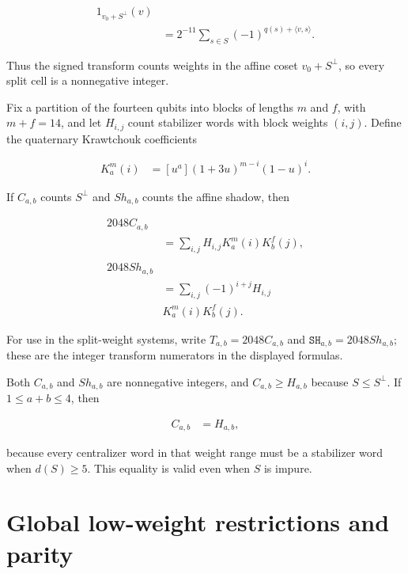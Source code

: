 \documentclass[11pt]{article}
\begin{document}
\[
\begin{aligned}
1_{v_{0}+S^\perp}(v) \\
& = 2^{-11} \sum_{s \in S} (-1)^{q(s)+\langle v,s \rangle}.
\end{aligned}
\]

Thus the signed transform counts weights in the affine coset \(v_{0}+S^\perp\), so every split cell is a nonnegative integer.

Fix a partition of the fourteen qubits into blocks of lengths \(m\) and \(f\), with \(m+f=14\), and let \(H_{i,j}\) count stabilizer words with block weights \((i,j)\). Define the quaternary Krawtchouk coefficients

\[
\begin{aligned}
K_{a}^{m}(i) &=[u^{a}] (1+3u)^{m-i} (1-u)^{i}.
\end{aligned}
\]

If \(C_{a,b}\) counts \(S^\perp\) and \(Sh_{a,b}\) counts the affine shadow, then

\[
\begin{aligned}
2048 C_{a,b} \\
& = \sum_{i,j} H_{i,j} K_{a}^{m}(i) K_{b}^{f}(j), \\
\\[0.4ex]
2048 Sh_{a,b} \\
& = \sum_{i,j} (-1)^{i+j} H_{i,j} \\
& K_{a}^{m}(i) K_{b}^{f}(j).
\end{aligned}
\]

For use in the split-weight systems, write \(T_{a,b}=2048C_{a,b}\) and \(\mathtt{SH}_{a,b}=2048Sh_{a,b}\); these are the integer transform numerators in the displayed formulas.

Both \(C_{a,b}\) and \(Sh_{a,b}\) are nonnegative integers, and \(C_{a,b} \ge H_{a,b}\) because \(S  \le  S^\perp\). If \(1 \le a+b \le 4\), then

\[
\begin{aligned}
C_{a,b} &=H_{a,b},
\end{aligned}
\]

because every centralizer word in that weight range must be a stabilizer word when \(d(S) \ge 5\). This equality is valid even when \(S\) is impure.

\section{Global low-weight restrictions and parity}\label{global-low-weight-restrictions-and-parity}
\end{document}
